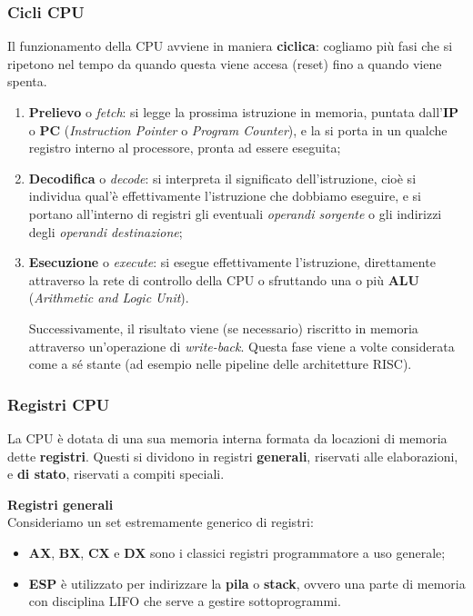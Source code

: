 \documentclass[a4paper,11pt]{article}
\begin{document}
\subsubsection{Cicli CPU}
Il funzionamento della CPU avviene in maniera \textbf{ciclica}: cogliamo più fasi che si ripetono nel tempo da quando questa viene accesa (reset) fino a quando viene spenta.
\begin{enumerate}
	\item \textbf{Prelievo} o \textit{fetch}: si legge la prossima istruzione in memoria, puntata dall'\textbf{IP} o \textbf{PC} (\textit{Instruction Pointer} o \textit{Program Counter}), e la si porta in un qualche registro interno al processore, pronta ad essere eseguita;
	\item \textbf{Decodifica} o \textit{decode}: si interpreta il significato dell'istruzione, cioè si individua qual'è effettivamente l'istruzione che dobbiamo eseguire, e si portano all'interno di registri gli eventuali \textit{operandi sorgente} o gli indirizzi degli \textit{operandi destinazione};
	\item \textbf{Esecuzione} o \textit{execute}: si esegue effettivamente l'istruzione, direttamente attraverso la rete di controllo della CPU o sfruttando una o più \textbf{ALU} (\textit{Arithmetic and Logic Unit}). 

		Successivamente, il risultato viene (se necessario) riscritto in memoria attraverso un'operazione di \textit{write-back}. Questa fase viene a volte considerata come a sé stante (ad esempio nelle pipeline delle architetture RISC).
\end{enumerate}

\subsubsection{Registri CPU}
La CPU è dotata di una sua memoria interna formata da locazioni di memoria dette \textbf{registri}.
Questi si dividono in registri \textbf{generali}, riservati alle elaborazioni, e \textbf{di stato}, riservati a compiti speciali.

\par\medskip
\textbf{\textsf{Registri generali}} \\
Consideriamo un set estremamente generico di registri:
\begin{itemize}
	\item \textbf{AX}, \textbf{BX}, \textbf{CX} e \textbf{DX} sono i classici registri programmatore a uso generale;
	\item \textbf{ESP} è utilizzato per indirizzare la \textbf{pila} o \textbf{stack}, ovvero una parte di memoria con disciplina LIFO che serve a gestire sottoprogrammi.
\end{itemize}
\end{document}

